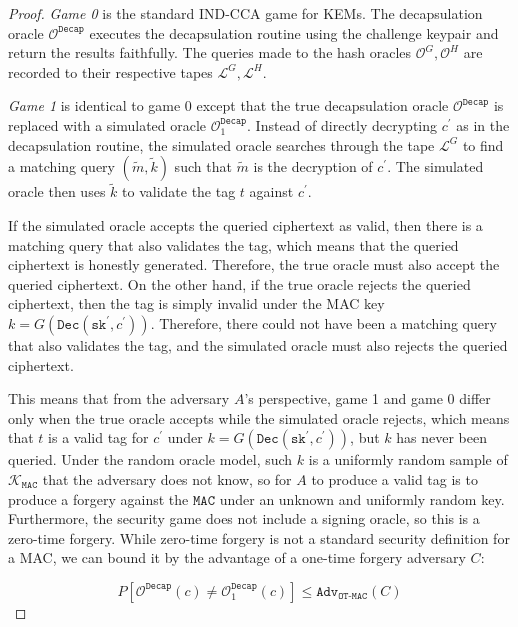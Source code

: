 \documentclass[journal=tches,submission]{iacrtrans}
\newcommand{\decrypt}{\texttt{Dec}}
\newcommand{\decap}{\texttt{Decap}}
\newcommand{\mac}{\texttt{MAC}}
\newcommand{\sk}{\texttt{sk}}
\newcommand{\adv}{\texttt{Adv}}
\begin{document}
\begin{proof}
    \emph{Game 0} is the standard IND-CCA game for KEMs. The decapsulation oracle $\mathcal{O}^\decap$ executes the decapsulation routine using the challenge keypair and return the results faithfully. The queries made to the hash oracles $\mathcal{O}^G, \mathcal{O}^H$ are recorded to their respective tapes $\mathcal{L}^G, \mathcal{L}^H$.

    \emph{Game 1} is identical to game 0 except that the true decapsulation oracle $\mathcal{O}^\decap$ is replaced with a simulated oracle $\mathcal{O}^\decap_1$. Instead of directly decrypting $c^\prime$ as in the decapsulation routine, the simulated oracle searches through the tape $\mathcal{L}^G$ to find a matching query $(\tilde{m}, \tilde{k})$ such that $\tilde{m}$ is the decryption of $c^\prime$. The simulated oracle then uses $\tilde{k}$ to validate the tag $t$ against $c^\prime$.

    If the simulated oracle accepts the queried ciphertext as valid, then there is a matching query that also validates the tag, which means that the queried ciphertext is honestly generated. Therefore, the true oracle must also accept the queried ciphertext. On the other hand, if the true oracle rejects the queried ciphertext, then the tag is simply invalid under the MAC key $k = G(\decrypt(\sk^\prime, c^\prime))$. Therefore, there could not have been a matching query that also validates the tag, and the simulated oracle must also rejects the queried ciphertext.

    This means that from the adversary $A$'s perspective, game 1 and game 0 differ only when the true oracle accepts while the simulated oracle rejects, which means that $t$ is a valid tag for $c^\prime$ under $k = G(\decrypt(\sk^\prime, c^\prime))$, but $k$ has never been queried. Under the random oracle model, such $k$ is a uniformly random sample of $\mathcal{K}_\mac$ that the adversary does not know, so for $A$ to produce a valid tag is to produce a forgery against the $\mac$ under an unknown and uniformly random key. Furthermore, the security game does not include a signing oracle, so this is a zero-time forgery. While zero-time forgery is not a standard security definition for a MAC, we can bound it by the advantage of a one-time forgery adversary $C$:

    \begin{equation*}
        P\left[\mathcal{O}^\decap(c) \neq \mathcal{O}^\decap_1(c)\right]
        \leq \adv_\texttt{OT-MAC}(C)
    \end{equation*}


\end{proof}
\end{document}
